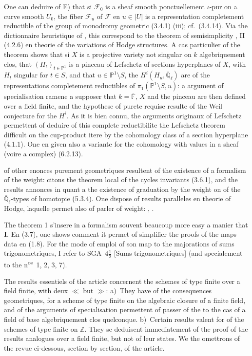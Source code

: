 \documentclass[12pt,a4paper]{article}
\theoremstyle{plain}
\theoremstyle{definition}
\theoremstyle{definition}
\theoremstyle{remark}
\begin{document}
One can deduire of E) that si $\mathscr{F}_0$ is a sheaf smooth ponctuellement $\iota$-pur on a curve smooth $U_0$, the fiber $\mathscr{F}_u$ of $\mathscr{F}$ en $u \in |U|$ is a representation completement reductible of the group of monodromy geometric (3.4.1) (iii); cf.~(3.4.14). Via the dictionnaire heuristique of \cite{HodgeI}, this correspond to the theorem of semisimplicity \cite{HodgeII}, II (4.2.6) en theorie of the variations of Hodge structures. A cas particulier of the theorem shows that si $X$ is a projective variety not singular on $k$ algebriquement clos, that $(H_t)_{t \in \mathbb{P}^1}$ is a pinceau of Lefschetz of sections hyperplanes of $X$, with $H_t$ singular for $t \in S$, and that $u \in \mathbb{P}^1 \setminus S$, the $H^i(H_u, \overline{\mathbb{Q}}_\ell)$ are of the representations completement reductibles of $\pi_1(\mathbb{P}^1 \setminus S, u)$: a argument of specialisation ramene a supposer that $k = \overline{\mathbb{F}}$, $X$ and the pinceau are then defined over a field finite, and the hypothese of purete requise resulte of the Weil conjecture for the $H^i$. As it is bien connu, the arguments originaux of Lefschetz permettent of deduire of this complete reductibilite the Lefschetz theorem difficult on the cup-product itere by the cohomology class of a section hyperplane (4.1.1). One en given also a variante for the cohomology with values in a sheaf (voire a complex) (6.2.13).

of other enonces purement geometriques resultent of the existence of a formalism of the weight: citons the theorem local of the cycles invariants (3.6.1), and the results annonces in \cite{Berlin} quant a the existence of graduation by the weight on of the $\overline{\mathbb{Q}}_\ell$-types of homotopie (5.3.4). One dispose of results paralleles en theorie of Hodge, laquelle permet also of parler of weight: \cite{Schmid}, \cite{Steenbrink}.

The theorem 1 s'insere in a formalism souvent beaucoup more easy a manier that \textbf{I}. En (3.7), one shows comment it permet of simplifier the proofs of the maps data en (1.8). For the mode of emploi of son map to the majorations of sums trigonometriques, I refer to SGA~$4\frac{1}{2}$ [Sums trigonometriques] (and specialement to the n\textsuperscript{os}~1, 2, 3, 7).

The results essentiels of the article concernent the schemes of type finite over a field finite, with deux $\ll$ but $\gg$: a)~They have of the consequences geometriques, for a scheme of type finite on the algebraic closure of a finite field, and of the arguments of specialisation permettent of passer of the to the cas of a field of base algebriquement clos quelconque. b)~Certain results valent for of the schemes of type finite on $\mathbb{Z}$. They se deduisent immediatement of the proof of the results analogues over a field finite, but not of leur states. We the omettrons of the revue ci-dessous, section by section, of the article.
\end{document}

